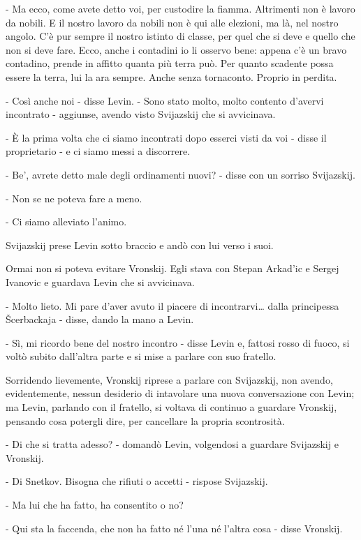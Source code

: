 - Ma ecco, come avete detto voi, per custodire la fiamma. Altrimenti non è lavoro da nobili. E il nostro lavoro da nobili non è qui alle elezioni, ma là, nel nostro angolo. C'è pur sempre il nostro istinto di classe, per quel che si deve e quello che non si deve fare. Ecco, anche i contadini io li osservo bene: appena c'è un bravo contadino, prende in affitto quanta più terra può. Per quanto scadente possa essere la terra, lui la ara sempre. Anche senza tornaconto. Proprio in perdita. 

- Così anche noi - disse Levin. - Sono stato molto, molto contento d'avervi incontrato - aggiunse, avendo visto Svijazskij che si avvicinava. 

- È la prima volta che ci siamo incontrati dopo esserci visti da voi - disse il proprietario - e ci siamo messi a discorrere. 

- Be', avrete detto male degli ordinamenti nuovi? - disse con un sorriso Svijazskij. 

- Non se ne poteva fare a meno. 

- Ci siamo alleviato l'animo. 

\label{xxx-4} 

Svijazskij prese Levin sotto braccio e andò con lui verso i suoi. 

Ormai non si poteva evitare Vronskij. Egli stava con Stepan Arkad'ic e Sergej Ivanovic e guardava Levin che si avvicinava. 

- Molto lieto. Mi pare d'aver avuto il piacere di incontrarvi\ldots{} dalla principessa Šcerbackaja - disse, dando la mano a Levin. 

- Sì, mi ricordo bene del nostro incontro - disse Levin e, fattosi rosso di fuoco, si voltò subito dall'altra parte e si mise a parlare con suo fratello. 

Sorridendo lievemente, Vronskij riprese a parlare con Svijazskij, non avendo, evidentemente, nessun desiderio di intavolare una nuova conversazione con Levin; ma Levin, parlando con il fratello, si voltava di continuo a guardare Vronskij, pensando cosa potergli dire, per cancellare la propria scontrosità. 

- Di che si tratta adesso? - domandò Levin, volgendosi a guardare Svijazskij e Vronskij. 

- Di Snetkov. Bisogna che rifiuti o accetti - rispose Svijazskij. 

- Ma lui che ha fatto, ha consentito o no? 

- Qui sta la faccenda, che non ha fatto né l'una né l'altra cosa - disse Vronskij. 

